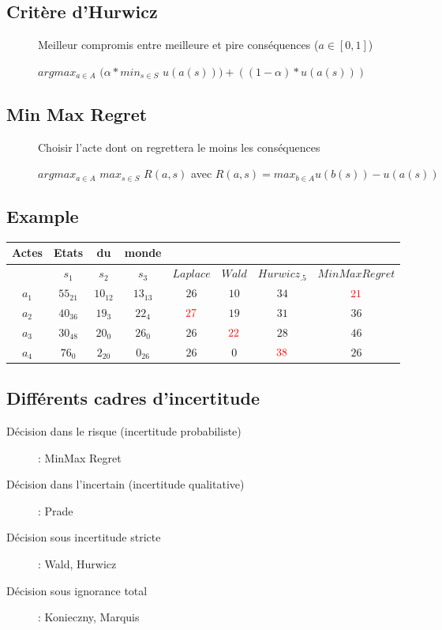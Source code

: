\subsection{Critère d'Hurwicz}
\begin{description}
\item[] Meilleur compromis entre meilleure et pire conséquences ($a \in [0,1]$)
\item[] $argmax_{a \in A}$ $( \alpha * min_{s \in S}$ $u(a(s))) + (( 1 - \alpha ) * u(a(s)))$
\end{description}

\subsection{Min Max Regret}
\begin{description}
\item[] Choisir l'acte dont on regrettera le moins les conséquences
\item[] $argmax_{a \in A}$ $max_{s \in S}$ $R(a,s)$ avec $R(a,s) = max_{b \in A} u(b(s)) - u(a(s))$
\end{description}

\subsection{Example}

\begin{tabular}{c|ccc|cccc}
\hline
Actes & Etats & du & monde & $ $ & $ $ & $ $ & $ $\\
\hline
$ $  & $s_1$ & $s_2$ & $s_3$ & $Laplace$ & $Wald$ & $Hurwicz_{.5}$ & $MinMax Regret$ \\
\hline
$a_1$ & $55_{21}$ & $10_{12}$ & $13_{13}$ & $26$ & $10$ & $34$ & $\textcolor{red}{21}$\\
$a_2$ & $40_{36}$ & $19_3$ & $22_4$ & $\textcolor{red}{27}$ & $19$ & $31$ & $36$\\
$a_3$ & $30_{48}$ & $20_0$ & $26_0$ & $26$ & $\textcolor{red}{22}$ & $28$ & $46$\\
$a_4$ & $76_0$ & $2_{20}$ & $0_{26}$ & $26$ & $0$ & $\textcolor{red}{38}$ & $26$\\
\hline
\end{tabular}

\pagebreak

\subsection{Différents cadres d'incertitude}
\begin{description}
\item[Décision dans le risque (incertitude probabiliste)]: MinMax Regret
\item[Décision dans l'incertain (incertitude qualitative)]: Prade
\item[Décision sous incertitude stricte]: Wald, Hurwicz
\item[Décision sous ignorance total]: Konieczny, Marquis
\end{description}

